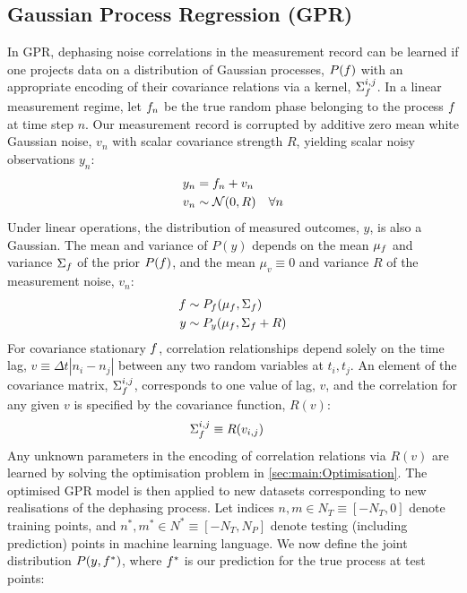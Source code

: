 \subsection{Gaussian Process Regression (GPR)}

In GPR, dephasing noise correlations in the measurement record can be learned if one projects data on a distribution of Gaussian processes, $P(f)$ with an appropriate encoding of their covariance relations via a kernel, $\Sigma_f^{i,j}$. In a linear measurement regime, let $f_n$ be the true random phase belonging to the process $f$ at time step $n$. Our measurement record is corrupted by additive zero mean white Gaussian noise, $v_n$ with scalar covariance strength $R$, yielding scalar noisy observations $y_n$:
\begin{align}
y_n &= f_n + v_n \\
v_n & \sim \mathcal{N}(0, R) \quad \forall n
\end{align}
Under linear operations, the distribution of measured outcomes, $y$, is also a Gaussian. The  mean and variance of $P(y)$  depends on the mean $\mu_f$ and variance $\Sigma_f$ of the prior $P(f)$, and the mean $\mu_v \equiv 0$ and variance $R$ of the measurement noise, $v_n$: 
\begin{align}
f & \sim P_f(\mu_f,\Sigma_f ) \\
y & \sim P_y(\mu_f,\Sigma_f + R ) 
\end{align}
For covariance stationary $f$, correlation relationships depend solely on the time lag, $v \equiv \Delta t|n_i - n_j|$ between any two random variables at $t_i, t_j$.  An element of the covariance matrix, $\Sigma_f^{i,j}$, corresponds to one value of lag, $v$, and the correlation for any given $v$  is specified by the covariance function, $R(v)$:
\begin{align}
\Sigma_f^{i,j} & \equiv R(v_{i,j}) 
\end{align}
Any unknown parameters in the encoding of correlation relations via $R(v)$ are learned by solving the optimisation problem in \cref{sec:main:Optimisation}. The optimised GPR model is then applied to new datasets corresponding to new realisations of the dephasing process. Let indices $n,m \in N_T \equiv [-N_T, 0]$ denote training points, and $n^*,m^* \in N^* \equiv [-N_T, N_P]$ denote testing (including prediction) points in machine learning language. We now define the joint distribution $P(y,f^*)$, where $f^*$ is our prediction for the true process at test points: 
